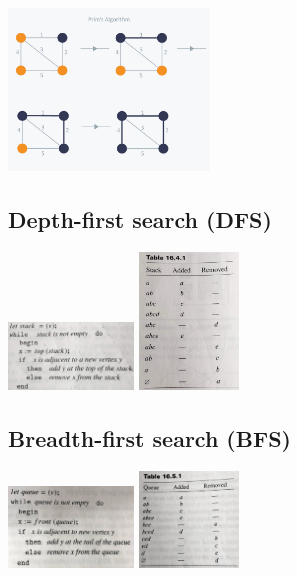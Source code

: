 \documentclass{article}
\begin{document}
\begin{multicols}{2}
\includegraphics[width=0.4\textwidth]{images/prim}

\subsection{Depth-first search (DFS)}
\includegraphics[width=0.25\textwidth]{images/DFS_alg}
\includegraphics[width=0.2\textwidth]{images/DFS_dia}


\subsection{Breadth-first search (BFS)}
\includegraphics[width=0.25\textwidth]{images/BFS_alg}
\includegraphics[width=0.2\textwidth]{images/BFS_dia}


\end{multicols}
\end{document}
